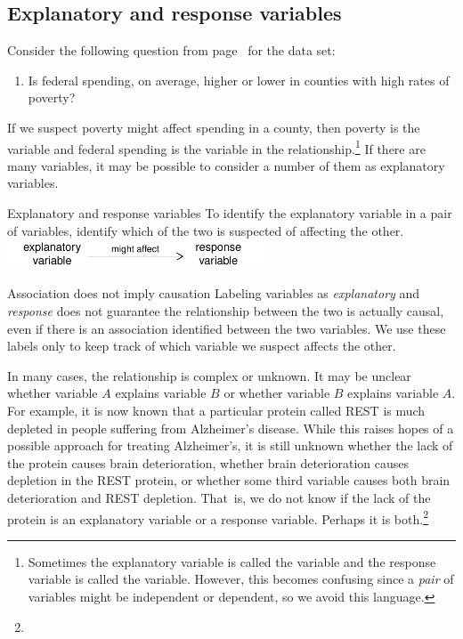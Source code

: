 \textA{\pagebreak}

\subsection{Explanatory and response variables}
\label{explanatoryAndResponse}


Consider the following question from page~\pageref{fedSpendingPovertyQuestion} for the  data set:
\begin{enumerate}
\item[(1)]
	Is federal spending, on average, higher or lower in counties with high rates of poverty?
\end{enumerate}
If we suspect poverty might affect spending in a county, then poverty is the  variable and federal spending is the  variable in the relationship.\footnote{Sometimes the explanatory variable is called the  variable and the response variable is called the  variable. However, this becomes confusing since a \emph{pair} of variables might be independent or dependent, so we avoid this language.} If there are many variables, it may be possible to consider a number of them as explanatory variables.

\begin{onebox}{Explanatory and response variables}
To identify the explanatory variable in a pair of variables, identify which of the two is suspected of affecting the other.
\hspace{10mm}\includegraphics[height=0.34in]{ch_data_collection/figures/expResp/expResp}
\end{onebox}

\begin{onebox}{Association does not imply causation}
{Labeling variables as \emph{explanatory} and \emph{response} does not guarantee the relationship between the two is actually causal, even if there is an association identified between the two variables. We use these labels only to keep track of which variable we suspect affects the other.}
\end{onebox}

In many cases, the relationship is complex or unknown. It may be unclear whether variable $A$ explains variable $B$ or whether variable $B$ explains variable $A$. For example, it is now known that a particular protein called REST is much depleted in people suffering from Alzheimer's disease. While this raises hopes of a possible approach for treating Alzheimer's, it is still unknown whether the lack of the protein causes brain deterioration, whether brain deterioration causes depletion in the REST protein, or whether some third variable causes both brain deterioration and REST depletion. That~is, we do not know if the lack of the protein is an explanatory variable or a response variable. Perhaps it is both.\footnote{}


